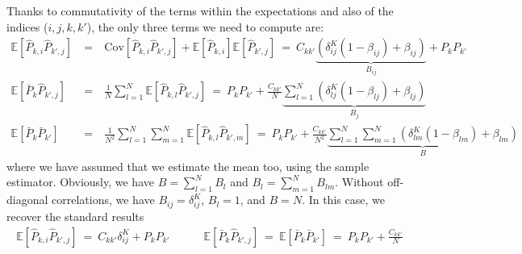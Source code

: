 \documentclass{aastex6}
\newcommand{\EE}{\mathbb{E}}
\newcommand{\eqn}[1]{\begin{eqnarray}#1\end{eqnarray}}
\begin{document}
Thanks to commutativity of the terms within the expectations and also of the indices ($i, j, k, k'$), the only three terms we need to compute are:\
\eqn{
	 \EE[\hat{P}_{k, i}\hat{P}_{k', j}] \ &=& \  \mathrm{Cov}[\hat{P}_{k, i}\hat{P}_{k', j}] + \mathbb{E}[\hat{P}_{k, i}]\mathbb{E}[\hat{P}_{k', j}]  \ =  \ C_{kk'} \underbrace{\left( \delta^K_{ij}(1-\beta_{ij}) + \beta_{ij} \right)}_{B_{ij}} + P_k P_{k'} \\
	 \EE[\bar{P}_{k}\hat{P}_{k', j}] \ &=&\   \frac{1}{N}  \sum_{l=1}^{N}\EE[\hat{P}_{k, l}\hat{P}_{k', j}]  \ = \ P_k P_{k'} + \frac{C_{kk'} }{N}  \underbrace{ \sum_{l=1}^{N} \left( \delta^K_{lj}(1-\beta_{lj}) + \beta_{lj} \right)}_{B_j} \\
	 \EE[\bar{P}_{k}\bar{P}_{k'}] \ &=& \ \frac{1}{N^2}  \sum_{l=1}^{N}  \sum_{m=1}^{N} \EE[\hat{P}_{k, l}\hat{P}_{k', m}]  \  = \ P_k P_{k'} + \frac{C_{kk'}}{N^2} \underbrace{ \sum_{l=1}^{N}  \sum_{m=1}^{N}   \left( \delta^K_{lm}(1-\beta_{lm}) + \beta_{lm} \right)}_{B}
}
where we have assumed that we estimate the mean too, using the sample estimator. Obviously, we have $B=\sum_{l=1}^{N}  B_{l}$ and $B_l=\sum_{m=1}^{N}  B_{lm}$. 
Without off-diagonal correlations, we have $B_{ij} = \delta^K_{ij}$,  $B_l = 1$, and $B=N$. In this case, we recover the standard results
\eqn{
	 \EE[\hat{P}_{k, i}\hat{P}_{k', j}] \ = \  C_{kk'} \delta^K_{ij} + P_k P_{k'} \quad\quad\quad \EE[\bar{P}_{k}\hat{P}_{k', j}] \ =  \  \EE[\bar{P}_{k}\bar{P}_{k'}]  \ =\ P_k P_{k'} + \frac{C_{kk'} }{N}  
}
\end{document}
